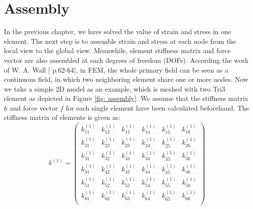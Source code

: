 \section{Assembly}
In the previous chapter, we have solved the value of strain and stress in one element. The next step is to assemble strain and stress at each node from the local view to the global view. Meanwhile, element stiffness matrix and force vector are also assembled at each degrees of freedom (DOFs). According the work of W. A. Wall [\cite{FiniteElement} p.62-64], in FEM, the whole primary field can be seen as a continuous field, in which two neighboring element share one or more nodes. Now we take a simple 2D model as an example, which is meshed with two Tri3 element as depicted in Figure \ref{fig: assembly}. We assume that the stiffness matrix $k$ and force vector $f$ for each single element have been calculated beforehand. The stiffness matrix of elements is given as:
\begin{equation} \label{eq: k_1}
k^{\left(1\right)} = \begin{pmatrix}
k_{11}^{\left(1\right)} & k_{12}^{\left(1\right)} &  k_{13}^{\left(1\right)} &  k_{14}^{\left(1\right)} & k_{15}^{\left(1\right)}  & k_{16}^{\left(1\right)}   \\[0.3em]
k_{21}^{\left(1\right)} & k_{22}^{\left(1\right)} &  k_{23}^{\left(1\right)} &  k_{24}^{\left(1\right)} & k_{25}^{\left(1\right)}  & k_{26}^{\left(1\right)}   \\[0.3em]
k_{31}^{\left(1\right)} & k_{32}^{\left(1\right)} &  k_{33}^{\left(1\right)} &  k_{34}^{\left(1\right)} & k_{35}^{\left(1\right)}  & k_{36}^{\left(1\right)}   \\[0.3em]
k_{41}^{\left(1\right)} & k_{42}^{\left(1\right)} &  k_{43}^{\left(1\right)} &  k_{44}^{\left(1\right)} & k_{45}^{\left(1\right)}  & k_{46}^{\left(1\right)}   \\[0.3em]
k_{51}^{\left(1\right)} & k_{52}^{\left(1\right)} &  k_{53}^{\left(1\right)} &  k_{54}^{\left(1\right)} & k_{55}^{\left(1\right)}  & k_{56}^{\left(1\right)}   \\[0.3em]
k_{61}^{\left(1\right)} & k_{62}^{\left(1\right)} &  k_{63}^{\left(1\right)} &  k_{64}^{\left(1\right)} & k_{65}^{\left(1\right)}  & k_{66}^{\left(1\right)}   \\[0.3em]
\end{pmatrix} 
\end{equation}	

